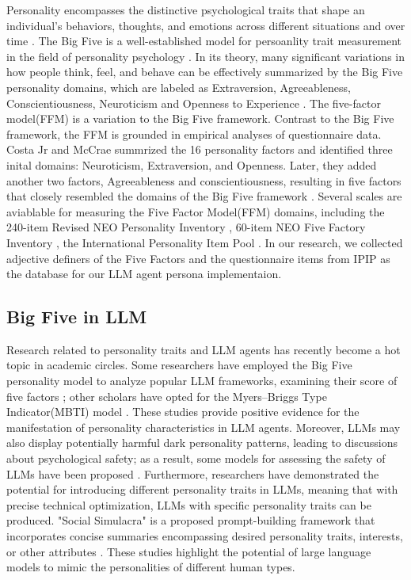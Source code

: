 \documentclass[11pt]{article}
\begin{document}
Personality encompasses the distinctive psychological traits that shape an individual's behaviors, thoughts, and emotions across different situations and over time \citep{roberts2000rank}. The Big Five is a well-established model for persoanlity trait measurement in the field of personality psychology \citep{john2008paradigm}. In its theory, many significant variations in how people think, feel, and behave can be effectively summarized by the Big Five personality domains, which are labeled as Extraversion, Agreeableness, Conscientiousness, Neuroticism and Openness to Experience \citep{costa1999five}. The five-factor model(FFM) is a variation to the Big Five framework. Contrast to the Big Five framework, the FFM is grounded in empirical analyses of questionnaire data. Costa Jr and McCrae \citep{costa1976age} summrized the 16 personality factors \citep{cattell1992handbook} and identified three inital domains: Neuroticism, Extraversion, and Openness. Later, they added another two factors, Agreeableness and conscientiousness, resulting in five factors that closely resembled the domains of the Big Five framework \citep{mccrae1987validation}. Several scales are aviablable for measuring the Five Factor Model(FFM) domains, including the 240-item Revised NEO Personality Inventory \citep{mccrae1991neo,costa2008revised}, 60-item NEO Five Factory Inventory \citep{mccrae1989neo,mccrae2004contemplated}, the International Personality Item Pool \citep{goldberg2006international}. In our research, we collected adjective definers of the Five Factors \citep{mccrae2004contemplated} and the questionnaire items from IPIP \citep{goldberg2006international} as the database for our LLM agent persona implementaion. 

\subsection{Big Five in LLM} \label{sec:big_five_llm}

Research related to personality traits and LLM agents has recently become a hot topic in academic circles. Some researchers have employed the Big Five personality model to analyze popular LLM frameworks, examining their score of five factors \citep{karra2022estimating,caron2022identifying}; other scholars have opted for the Myers–Briggs Type Indicator(MBTI) model \citep{pan2023llms}. These studies provide positive evidence for the manifestation of personality characteristics in LLM agents. Moreover, LLMs may also display potentially harmful dark personality patterns, leading to discussions about psychological safety; as a result, some models for assessing the safety of LLMs have been proposed \citep{li2022does}. Furthermore, researchers \citep{safdari2023personality} have demonstrated the potential for introducing different personality traits in LLMs, meaning that with precise technical optimization, LLMs with specific personality traits can be produced. "Social Simulacra" is a proposed prompt-building framework that incorporates concise summaries encompassing desired personality traits, interests, or other attributes \citep{park2022social}. These studies highlight the potential of large language models to mimic the personalities of different human types.
\end{document}
